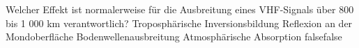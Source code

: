     {Welcher Effekt ist normalerweise für die Ausbreitung eines VHF-Signals über 800 bis 1 000 km verantwortlich?}
    {Troposphärische Inversionsbildung}
    {Reflexion an der Mondoberfläche}
    {Bodenwellenausbreitung}
    {Atmosphärische Absorption}
    {false}{false}